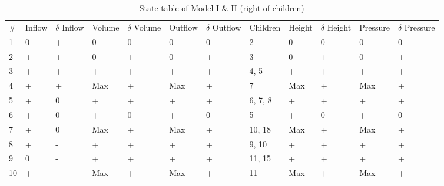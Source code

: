 \documentclass{article}
\begin{document}
\begin{table}
	\small
	\caption{State table of Model I \& II (right of children)}
	\begin{adjustbox}{center}
	\begin{tabular}{@{}llllllllllll}
		\# & Inflow & $\delta$ Inflow & Volume & $\delta$ Volume & Outflow & $\delta$ Outflow & Children & Height & $\delta$ Height & Pressure & $\delta$ Pressure  \\
		1  & 0      & +           & 0      & 0           & 0       & 0            & 2        & 0      & 0                                & 0        & 0                                   \\
		2  & +      & +           & 0      & +           & 0       & +            & 3        & 0      & +                                & 0        & +                                   \\
		3  & +      & +           & +      & +           & +       & +            & 4, 5     & +      & +                                & +        & +                                   \\
		4  & +      & +           & Max    & +           & Max     & +            & 7        & Max    & +                                & Max      & +                                   \\
		5  & +      & 0           & +      & +           & +       & +            & 6, 7, 8  & +      & +                                & +        & +                                   \\
		6  & +      & 0           & +      & 0           & +       & 0            & 5        & +      & 0                                & +        & 0                                   \\
		7  & +      & 0           & Max    & +           & Max     & +            & 10, 18   & Max    & +                                & Max      & +                                   \\
		8  & +      & -           & +      & +           & +       & +            & 9, 10    & +      & +                                & +        & +                                   \\
		9  & 0      & -           & +      & +           & +       & +            & 11, 15   & +      & +                                & +        & +                                   \\
		10 & +      & -           & Max    & +           & Max     & +            & 11       & Max    & +                                & Max      & +                                   \\

\end{tabular}
\end{adjustbox}
\end{table}
\end{document}
